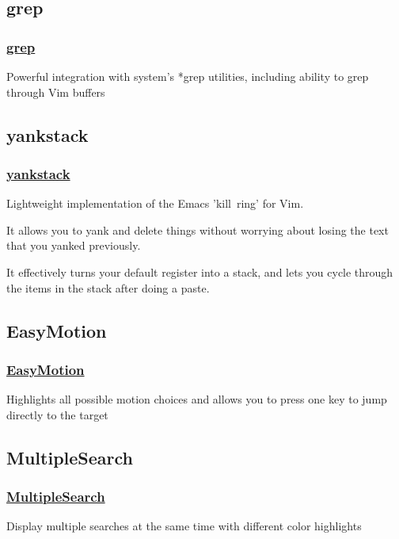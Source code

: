 \documentclass[14pt,svgnames,compress]{beamer}
\newcommand\hl[1]{\textcolor{HlColor}{#1}}
\begin{document}
\subsection{grep}

\begin{frame}
    \frametitle{
        \href{https://github.com/vim-scripts/grep.vim}
             {grep}
    }
    \large
    Powerful integration with system's \hl{*grep} utilities, including ability
    to grep through Vim buffers \\
\end{frame}


\subsection{yankstack}

\begin{frame}
    \frametitle{
        \href{https://github.com/vim-scripts/yankstack}
             {yankstack}
    }
    Lightweight implementation of the Emacs 'kill~ring' for Vim. \\ \bigskip

    It allows you to yank and delete things without worrying about losing the
    text that you yanked previously. \\ \bigskip

    It effectively turns your default register into a stack, and lets you cycle
    through the items in the stack after doing a paste. \\
\end{frame}


\subsection{EasyMotion}

\begin{frame}
    \frametitle{
        \href{https://github.com/vim-scripts/EasyMotion}
             {EasyMotion}
    }
    \large
    Highlights all possible motion choices and allows you to press one key to
    jump directly to the target \\
\end{frame}


\subsection{MultipleSearch}

\begin{frame}
    \frametitle{
        \href{https://github.com/vim-scripts/MultipleSearch}
             {MultipleSearch}
    }
    \large
    Display multiple searches at the same time with different color highlights \\
\end{frame}
\end{document}
